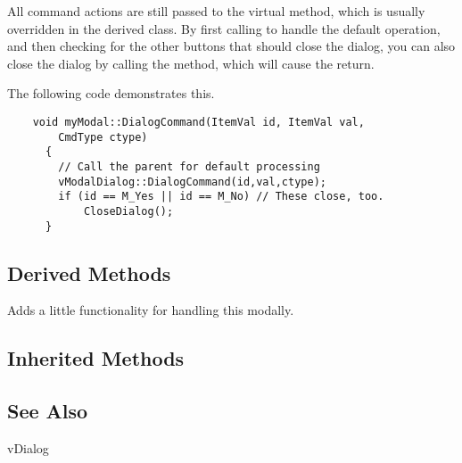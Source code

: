 All command actions are still passed to the virtual 
method, which is usually overridden in the derived class. By
first calling 
to handle the default operation, and then checking for the
other buttons that should close the dialog, you can also close
the dialog by calling the  method, which will
cause the return.

The following code demonstrates this.

\footnotesize
\begin{verbatim}
    void myModal::DialogCommand(ItemVal id, ItemVal val,
        CmdType ctype)
      {
        // Call the parent for default processing
        vModalDialog::DialogCommand(id,val,ctype);
        if (id == M_Yes || id == M_No) // These close, too.
            CloseDialog();
      }
\end{verbatim}
\normalfont\normalsize

\subsection* {Derived Methods}


Adds a little functionality for handling this modally.

\subsection* {Inherited Methods}




\subsection* {See Also}

vDialog
